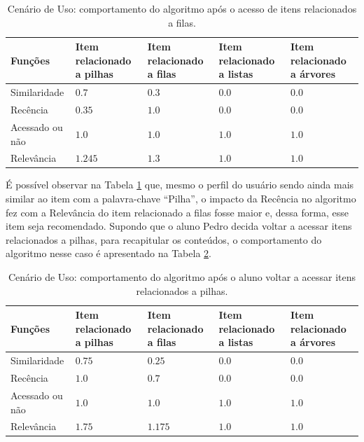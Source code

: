\begin{table}[h]
\footnotesize
\caption[Cenário de Uso: comportamento do algoritmo após o acesso de itens relacionados a filas.]{Cenário de Uso: comportamento do algoritmo após o acesso de itens relacionados a filas.}
\label{tab:cenario-de-uso-2}
\centering
\begin{tabular}{|p{2cm}|p{2.5cm}|p{2.5cm}|p{2.5cm}|p{2.5cm}|}
  \hline
  \textbf{Funções} & \textbf{Item relacionado a pilhas} & \textbf{Item relacionado a filas} & \textbf{Item relacionado a listas} & \textbf{Item relacionado a árvores} \\
  \hline
  Similaridade & $0.7$ & $0.3$ & $0.0$ & $0.0$ \\
  \hline
  Recência & $0.35$ & $1.0$ & $0.0$ & $0.0$ \\
  \hline
  Acessado ou não & $1.0$ & $1.0$ & $1.0$ & $1.0$ \\
  \hline
  Relevância & $1.245$ & $1.3$ & $1.0$ & $1.0$ \\
  \hline
\end{tabular}
\end{table}

É possível observar na Tabela \ref{tab:cenario-de-uso-2} que, mesmo o perfil do usuário sendo ainda mais similar ao item
com a palavra-chave ``Pilha'', o impacto da Recência no algoritmo fez com a Relevância do item relacionado a filas
fosse maior e, dessa forma, esse item seja recomendado. Supondo que o aluno Pedro decida voltar a acessar itens
relacionados a pilhas, para recapitular os conteúdos, o comportamento do algoritmo nesse caso é apresentado na Tabela
\ref{tab:cenario-de-uso-3}.

\begin{table}[h]
\footnotesize
\caption[Cenário de Uso: comportamento do algoritmo após o aluno voltar a acessar itens relacionados a pilhas.]{Cenário de Uso: comportamento do algoritmo após o aluno voltar a acessar itens relacionados a pilhas.}
\label{tab:cenario-de-uso-3}
\centering
\begin{tabular}{|p{2cm}|p{2.5cm}|p{2.5cm}|p{2.5cm}|p{2.5cm}|}
  \hline
  \textbf{Funções} & \textbf{Item relacionado a pilhas} & \textbf{Item relacionado a filas} & \textbf{Item relacionado a listas} & \textbf{Item relacionado a árvores} \\
  \hline
  Similaridade & $0.75$ & $0.25$ & $0.0$ & $0.0$ \\
  \hline
  Recência & $1.0$ & $0.7$ & $0.0$ & $0.0$ \\
  \hline
  Acessado ou não & $1.0$ & $1.0$ & $1.0$ & $1.0$ \\
  \hline
  Relevância & $1.75$ & $1.175$ & $1.0$ & $1.0$ \\
  \hline
\end{tabular}
\end{table}

